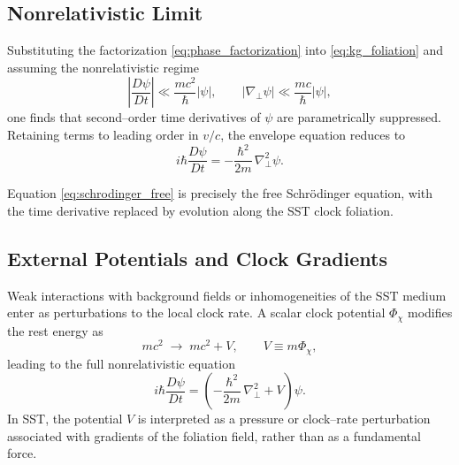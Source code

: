 \documentclass[11pt]{article}
\begin{document}
        \subsection{Nonrelativistic Limit}

            Substituting the factorization \eqref{eq:phase_factorization} into \eqref{eq:kg_foliation} and assuming the nonrelativistic regime
            \begin{equation}
                \left| \frac{D\psi}{Dt} \right| \ll \frac{m c^2}{\hbar} |\psi|,
                \qquad
                \left| \nabla_\perp \psi \right| \ll \frac{m c}{\hbar} |\psi|,
            \end{equation}
            one finds that second--order time derivatives of $\psi$ are parametrically suppressed. Retaining terms to leading order in $v/c$, the envelope equation reduces to
            \begin{equation}
                i \hbar \frac{D\psi}{Dt}
                =
                -\frac{\hbar^2}{2m}\,\nabla_\perp^2 \psi .
                \label{eq:schrodinger_free}
            \end{equation}

            Equation \eqref{eq:schrodinger_free} is precisely the free Schr\"odinger equation, with the time derivative replaced by evolution along the SST clock foliation.

        \subsection{External Potentials and Clock Gradients}

            Weak interactions with background fields or inhomogeneities of the SST medium enter as perturbations to the local clock rate. A scalar clock potential $\Phi_\chi$ modifies the rest energy as
            \begin{equation}
                m c^2 \;\rightarrow\; m c^2 + V,
                \qquad
                V \equiv m \Phi_\chi ,
            \end{equation}
            leading to the full nonrelativistic equation
            \begin{equation}
                i \hbar \frac{D\psi}{Dt}
                =
                \left(
                    -\frac{\hbar^2}{2m}\,\nabla_\perp^2
                +
                V
                \right)\psi .
                \label{eq:schrodinger_full}
            \end{equation}
            In SST, the potential $V$ is interpreted as a pressure or clock--rate perturbation associated with gradients of the foliation field, rather than as a fundamental force.
\end{document}
